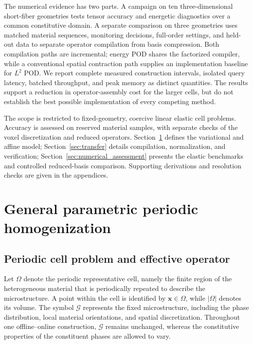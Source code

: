 \documentclass[pdflatex,sn-basic,Numbered]{sn-jnl}
\newcommand{\G}{\mathcal{G}}
\begin{document}
The numerical evidence has two parts. A campaign on ten three-dimensional
short-fiber geometries tests tensor accuracy and energetic diagnostics over a
common constitutive domain. A separate comparison on three geometries uses
matched material sequences, monitoring decisions, full-order settings, and
held-out data to separate operator compilation from basis compression. Both
compilation paths are incremental; energy POD shares the factorized compiler,
while a conventional spatial contraction path supplies an implementation
baseline for \(L^2\) POD. We report complete measured construction intervals,
isolated query latency, batched throughput, and peak memory as distinct
quantities. The results support a reduction in operator-assembly cost for the
larger cells, but do not establish the best possible implementation of every
competing method.

The scope is restricted to fixed-geometry, coercive linear elastic cell
problems. Accuracy is assessed on reserved material samples, with separate
checks of the voxel discretization and reduced operators.
Section~\ref{sec:homogenization} defines the variational and affine model;
Section~\ref{sec:transfer} details compilation, normalization, and verification;
Section~\ref{sec:numerical_assessment} presents the elastic benchmarks and
controlled reduced-basis comparison. Supporting derivations and resolution
checks are given in the appendices.

\section{General parametric periodic homogenization}
\label{sec:homogenization}

\subsection{Periodic cell problem and effective operator}
\label{subsec:cell_problem}
Let \(\Omega\) denote the periodic representative cell, namely the finite
region of the heterogeneous material that is periodically repeated to describe
the microstructure. A point within the cell is identified by
\(\boldsymbol{x}\in\Omega\), while \(|\Omega|\) denotes its volume. The symbol
\(\G\) represents the fixed microstructure, including the phase distribution,
local material orientations, and spatial discretization. Throughout one
offline--online construction, \(\G\) remains unchanged, whereas the
constitutive properties of the constituent phases are allowed to vary.
\end{document}
